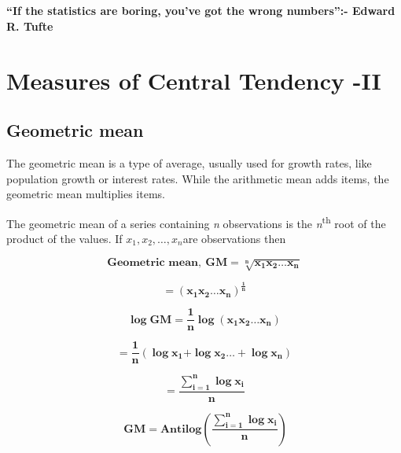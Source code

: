 \documentclass[
]{book}
\begin{document}
~\\
\hspace*{0.333em}\\
\hspace*{0.333em}

\hypertarget{hello}{}
\textbf{``If the statistics are boring, you've got the wrong
numbers'':- Edward R. Tufte}

\hypertarget{measures-of-central-tendency--ii}{%
\chapter{Measures of Central Tendency -II}\label{measures-of-central-tendency--ii}}

\hypertarget{geometric-mean}{%
\section{Geometric mean}\label{geometric-mean}}

The geometric mean is a type of average, usually used for growth rates,
like population growth or interest rates. While the arithmetic mean adds
items, the geometric mean multiplies items.

The geometric mean of a series containing \emph{n} observations is the
\emph{n}\textsuperscript{th} root of the product of the values. If
\(x_{1},x_{2},\ldots, x_{n}\)are observations then

\[\mathbf{\text{Geometric mean}}\mathbf{,\ }\mathbf{GM =}\sqrt[\mathbf{n}]{\mathbf{x}_{\mathbf{1}}\mathbf{x}_{\mathbf{2}}\mathbf{\ldots}\mathbf{x}_{\mathbf{n}}}\]

\[\mathbf{=}\left( \mathbf{x}_{\mathbf{1}}\mathbf{x}_{\mathbf{2}}\mathbf{\ldots}\mathbf{x}_{\mathbf{n}} \right)^{\frac{\mathbf{1}}{\mathbf{n}}}\]

\[\mathbf{\log}\mathbf{\text{GM}}\mathbf{=}\frac{\mathbf{1}}{\mathbf{n}}\mathbf{\log}\left( \mathbf{x}_{\mathbf{1}}\mathbf{x}_{\mathbf{2}}\mathbf{\ldots}\mathbf{x}_{\mathbf{n}} \right)\]

\[\mathbf{=}\frac{\mathbf{1}}{\mathbf{n}}\left( \mathbf{\log}\mathbf{x}_{\mathbf{1}}\mathbf{+}\mathbf{\log}\mathbf{x}_{\mathbf{2}}\mathbf{\ldots +}\mathbf{\log}\mathbf{x}_{\mathbf{n}} \right)\]

\[\mathbf{=}\frac{\sum_{\mathbf{i = 1}}^{\mathbf{n}}{\mathbf{\log}\mathbf{x}_{\mathbf{i}}}}{\mathbf{n}}\]

\[\mathbf{\ GM = Antilog}\left( \frac{\sum_{\mathbf{i = 1}}^{\mathbf{n}}{\mathbf{\log}\mathbf{x}_{\mathbf{i}}}}{\mathbf{n}} \right)\]
\end{document}
